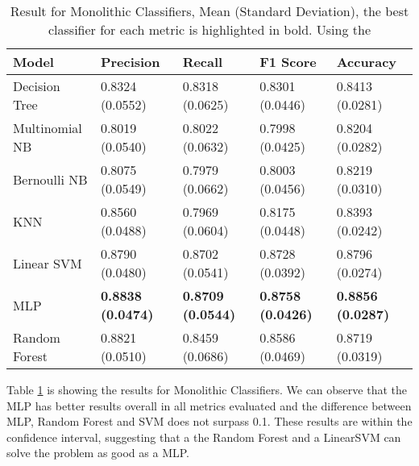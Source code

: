 \begin{table}[h!]
    \centering
    \renewcommand{\arraystretch}{1.8}
    \begin{tabular}{ p{3cm}p{2.8cm}p{2.8cm}p{2.8cm}p{2.8cm} }
        \toprule
        Model & Precision & Recall & F1 Score & Accuracy \\
        \midrule
        Decision Tree &     0.8324 (0.0552) & 0.8318 (0.0625) & 0.8301 (0.0446) & 0.8413 (0.0281) \\
        Multinomial NB &    0.8019 (0.0540) & 0.8022 (0.0632) & 0.7998 (0.0425) & 0.8204 (0.0282) \\
        Bernoulli NB &      0.8075 (0.0549) & 0.7979 (0.0662) & 0.8003 (0.0456) & 0.8219 (0.0310) \\
        KNN &               0.8560 (0.0488) & 0.7969 (0.0604) & 0.8175 (0.0448) & 0.8393 (0.0242) \\
        Linear SVM &        0.8790 (0.0480) & 0.8702 (0.0541) & 0.8728 (0.0392) & 0.8796 (0.0274) \\
        MLP &               \textbf{0.8838 (0.0474)} & \textbf{0.8709 (0.0544)} & \textbf{0.8758 (0.0426)} & \textbf{0.8856 (0.0287)} \\
        Random Forest &     0.8821 (0.0510) & 0.8459 (0.0686) & 0.8586 (0.0469) & 0.8719 (0.0319) \\ [1ex]
        \bottomrule
        \end{tabular}
        \caption{%
        Result for Monolithic Classifiers, Mean (Standard Deviation), the best classifier for each metric is highlighted in bold. Using the %
        }\label{table:result_monolithic}
\end{table}

Table \ref{table:result_monolithic} is showing the results for Monolithic Classifiers. We can observe that the MLP has better results overall in all metrics evaluated and the difference between MLP, Random Forest and SVM does not surpass 0.1. These results are within the confidence interval, suggesting that a the Random Forest and a LinearSVM can solve the problem as good as a MLP.